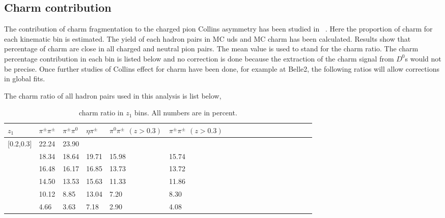 \subsection{Charm contribution}
\label{sec:charmcontribution}
The contribution of charm fragmentation to the charged pion Collins asymmetry has been studied in ~\cite{ChargedPionResult2}. Here the proportion of charm for each kinematic bin is estimated. The yield of each hadron pairs in MC uds and MC charm has been calculated. Results show that percentage of charm are close in all charged and neutral pion pairs. The mean value is used to stand for the charm ratio. The charm percentage contribution in each bin is listed below and no correction is done because the extraction of the charm signal from $D^0$s would not be precise. Once further studies of Collins effect for charm have been done, for example at Belle2, the following ratios will allow corrections in global fits. 

The charm ratio of all hadron pairs used in this analysis is list below,
\begin{table}[H]\footnotesize
\centering
\begin{tabular}{|l|l|l|l|l|l|l|l|l|l|l|l|l|l|l|l|l|l|}
\hline
$z_1$ & $\pi^{\pm}\pi^{\pm}$ & $\pi^{\pm}\pi^0$ & $\eta\pi^{\pm}$ & $\pi^0\pi^{\pm}$ $(z>0.3)$ & $\pi^{\pm}\pi^{\pm}$ $(z>0.3)$ \\ \hline
[0.2,0.3]	&	22.24	&	23.90	&		&		&		\\ \hline
[0.3,0.4]	&	18.34	&	18.64	&	19.71	&	15.98	&	15.74	\\ \hline
[0.4,0.5]	&	16.48	&	16.17	&	16.85	&	13.73	&	13.72	\\ \hline
[0.5,0.6]	&	14.50	&	13.53	&	15.63	&	11.33	&	11.86	\\ \hline
[0.6,0.7]	&	10.12	&	8.85	&	13.04	&	7.20	&	8.30	\\ \hline
[0.7,1.0]	&	4.66	&	3.63	&	7.18	&	2.90	&	4.08	\\ \hline\end{tabular}
\caption{charm ratio in $z_1$ bins. All numbers are in percent.}
\label{tab:sinzcharmratio}
\end{table}

